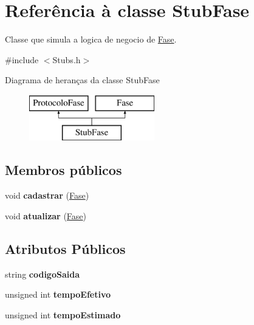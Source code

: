 \hypertarget{class_stub_fase}{
\section{\-Referência à classe \-Stub\-Fase}
\label{class_stub_fase}
}


\-Classe que simula a logica de negocio de \hyperlink{class_fase}{\-Fase}.  




{\ttfamily \#include $<$\-Stubs.\-h$>$}

\-Diagrama de heranças da classe \-Stub\-Fase\begin{figure}[H]
\begin{center}
\leavevmode
\includegraphics[height=2.000000cm]{class_stub_fase}
\end{center}
\end{figure}
\subsection*{\-Membros públicos}
\begin{DoxyCompactItemize}
\item 
\hypertarget{class_stub_fase_a7b7bcbc3c55c19fd43528d9918eb2c4e}{
void {\bfseries cadastrar} (\hyperlink{class_fase}{\-Fase})}
\label{class_stub_fase_a7b7bcbc3c55c19fd43528d9918eb2c4e}

\item 
\hypertarget{class_stub_fase_a2bd2b8628c5afb67b11e4803c79bc474}{
void {\bfseries atualizar} (\hyperlink{class_fase}{\-Fase})}
\label{class_stub_fase_a2bd2b8628c5afb67b11e4803c79bc474}

\end{DoxyCompactItemize}
\subsection*{\-Atributos \-Públicos}
\begin{DoxyCompactItemize}
\item 
\hypertarget{class_stub_fase_a21d3b78f971aecfe30d681e224dbf6da}{
string {\bfseries codigo\-Saida}}
\label{class_stub_fase_a21d3b78f971aecfe30d681e224dbf6da}

\item 
\hypertarget{class_stub_fase_a0faf568406692a8a6ac2e94654ab64d3}{
unsigned int {\bfseries tempo\-Efetivo}}
\label{class_stub_fase_a0faf568406692a8a6ac2e94654ab64d3}

\item 
\hypertarget{class_stub_fase_a7bb522d8e2941084d368a8a7098e2c9a}{
unsigned int {\bfseries tempo\-Estimado}}
\label{class_stub_fase_a7bb522d8e2941084d368a8a7098e2c9a}

\end{DoxyCompactItemize}



